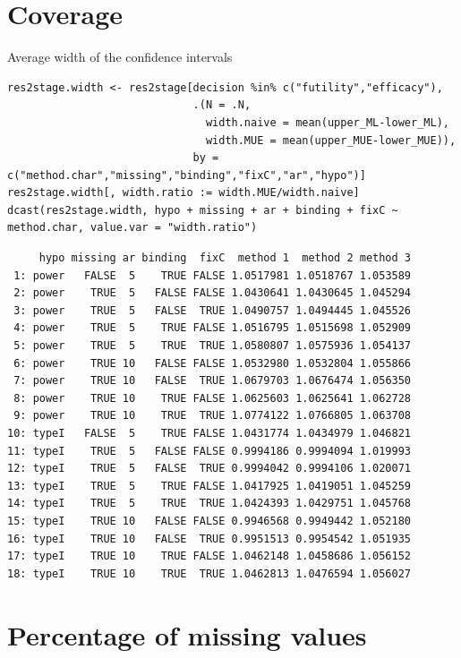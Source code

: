 \documentclass[12pt]{article}
\begin{document}
\section{Coverage}
\label{sec:orgfe83495}

Average width of the confidence intervals
\lstset{language=r,label= ,caption= ,captionpos=b,numbers=none}
\begin{lstlisting}
res2stage.width <- res2stage[decision %in% c("futility","efficacy"),
                             .(N = .N,
                               width.naive = mean(upper_ML-lower_ML),
                               width.MUE = mean(upper_MUE-lower_MUE)),
                             by = c("method.char","missing","binding","fixC","ar","hypo")]
res2stage.width[, width.ratio := width.MUE/width.naive]
dcast(res2stage.width, hypo + missing + ar + binding + fixC ~ method.char, value.var = "width.ratio")
\end{lstlisting}

\begin{verbatim}
     hypo missing ar binding  fixC  method 1  method 2 method 3
 1: power   FALSE  5    TRUE FALSE 1.0517981 1.0518767 1.053589
 2: power    TRUE  5   FALSE FALSE 1.0430641 1.0430645 1.045294
 3: power    TRUE  5   FALSE  TRUE 1.0490757 1.0494445 1.045526
 4: power    TRUE  5    TRUE FALSE 1.0516795 1.0515698 1.052909
 5: power    TRUE  5    TRUE  TRUE 1.0580807 1.0575936 1.054137
 6: power    TRUE 10   FALSE FALSE 1.0532980 1.0532804 1.055866
 7: power    TRUE 10   FALSE  TRUE 1.0679703 1.0676474 1.056350
 8: power    TRUE 10    TRUE FALSE 1.0625603 1.0625641 1.062728
 9: power    TRUE 10    TRUE  TRUE 1.0774122 1.0766805 1.063708
10: typeI   FALSE  5    TRUE FALSE 1.0431774 1.0434979 1.046821
11: typeI    TRUE  5   FALSE FALSE 0.9994186 0.9994094 1.019993
12: typeI    TRUE  5   FALSE  TRUE 0.9994042 0.9994106 1.020071
13: typeI    TRUE  5    TRUE FALSE 1.0417925 1.0419051 1.045259
14: typeI    TRUE  5    TRUE  TRUE 1.0424393 1.0429751 1.045768
15: typeI    TRUE 10   FALSE FALSE 0.9946568 0.9949442 1.052180
16: typeI    TRUE 10   FALSE  TRUE 0.9951513 0.9954542 1.051935
17: typeI    TRUE 10    TRUE FALSE 1.0462148 1.0458686 1.056152
18: typeI    TRUE 10    TRUE  TRUE 1.0462813 1.0476594 1.056027
\end{verbatim}

\section{Percentage of missing values}
\label{sec:orga0e8a8d}
\end{document}
